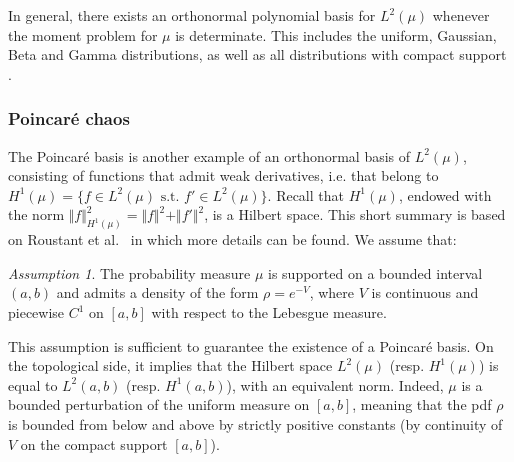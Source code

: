 \documentclass[a4paper,11pt]{article}
\renewcommand{\citep}[2][]{\cite[#1]{#2}}
\theoremstyle{definition}
\theoremstyle{remark}
\theoremstyle{theorem}
\newtheorem{assum}{Assumption}
\begin{document}
In general, there exists an orthonormal polynomial basis for $L^2(\mu)$ whenever the moment problem for $\mu$ is determinate. This includes the uniform, Gaussian, Beta and Gamma distributions, as well as all distributions with 
compact support \citep{Ernst2012}.

\subsubsection{Poincar\'e chaos}
\label{sec:PoinCE}

The Poincar\'e basis is another example of an orthonormal basis of $L^2(\mu)$, consisting of functions that admit weak derivatives, i.e. that belong to $H^1(\mu) = \{f \in L^2(\mu) \text{ s.t. } f' \in L^2(\mu) \}$.
Recall that $H^1(\mu)$, endowed with the norm $\Vert f \Vert_{H^1(\mu)}^2 = \Vert f \Vert^2 + \Vert f' \Vert^2$, is a Hilbert space. 
This short summary is based on Roustant et al.~\cite{roubar17} in which more details can be found. We assume that:

\begin{assum} \label{assum:measure}
	The probability measure $\mu$ is supported on a bounded interval $(a,b)$ and admits a density of the form $\rho = e^{-V}$, where $V$ is continuous and piecewise $C^1$ on $[a, b]$ with respect to the Lebesgue measure.
\end{assum}

This assumption is sufficient to guarantee the existence of a Poincar\'e basis. On the topological side, it implies that the Hilbert space $L^2(\mu)$ (resp. $H^1(\mu)$) is equal to $L^2(a, b)$ (resp. $H^1(a, b)$), with an equivalent norm. Indeed, $\mu$ is a bounded perturbation of the uniform measure on $[a, b]$, meaning that the pdf $\rho$ is bounded from below and above by strictly positive constants (by continuity of $V$ on the compact support $[a, b]$). 
\end{document}
